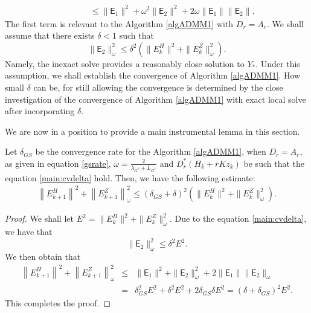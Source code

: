 \begin{itemize}
\begin{eqnarray*}
&& \qquad \leq \|\textsf{E}_1\|^2 + \omega^2 \|\textsf{E}_2\|^2 + 2 \omega \|\textsf{E}_1\| \|\textsf{E}_2\|. 
\end{eqnarray*}
The first term is relevant to the Algorithm \ref{algADMM1} with $D_r = A_r$. We shall assume that there exists $\delta < 1$ such that 
\begin{equation}\label{main:cvdelta}
\|\textsf{E}_2\|_\omega^2 \leq \delta^2 \left ( \|E_k^H\|^2 + \|E_k^Z\|_\omega^2 \right ).
\end{equation}
Namely, the inexact solve provides a reasonably close solution to $Y_*$. Under this assumption, we shall establish the convergence of Algorithm \ref{algADMM1}. How small $\delta$ can be, for still allowing the convergence is determined by the close investigation of the convergence of Algorithm \ref{algADMM1} with exact local solve after incorporating $\delta$.   

We are now in a position to provide a main instrumental lemma in this section. 
\begin{theorem}\label{main:ins}
Let $\delta_{GS}$ be the convergence rate for the Algorithm \ref{algADMM1}, when $D_r = A_r$, as given in equation \eqref{gsrate}, $\omega = \frac{2}{\lambda_{G^*} + L_{G^*}}$ and $D_r^*(H_k + rKz_k)$ be such that the equation \eqref{main:cvdelta} hold. Then, we have the following estimate:   
\begin{eqnarray*}
\left \|E_{k+1}^H \right \|^2 + \left \|E_{k+1}^Z \right \|_\omega^2 \leq \left ( \delta_{GS} + \delta \right )^2 \left ( \|E_k^H\|^2 + \|E_k^Z\|_\omega^2 \right ). 
\end{eqnarray*}
\end{theorem} 
\begin{proof}
We shall let $E^2 = \|E_k^H\|^2 + \|E_k^Z\|_\omega^2$. Due to the equation \eqref{main:cvdelta}, we have that 
\begin{equation}
\|\textsf{E}_2\|_\omega^2 \leq \delta^2 E^2. 
\end{equation}
We then obtain that 
\begin{eqnarray*}
\left \|E_{k+1}^H \right \|^2 + \left \|E_{k+1}^Z \right \|_\omega^2 &\leq& \|\textsf{E}_1\|^2 + \|\textsf{E}_2\|_\omega^2 + 2 \|\textsf{E}_1\| \|\textsf{E}_2\|_\omega  \\ 
&=& \delta_{GS}^2 E^2 + \delta^2 E^2 + 2 \delta_{GS} \delta E^2 = (\delta + \delta_{GS})^2 E^2. 
\end{eqnarray*}
This completes the proof. 
\end{proof}


\end{itemize}
